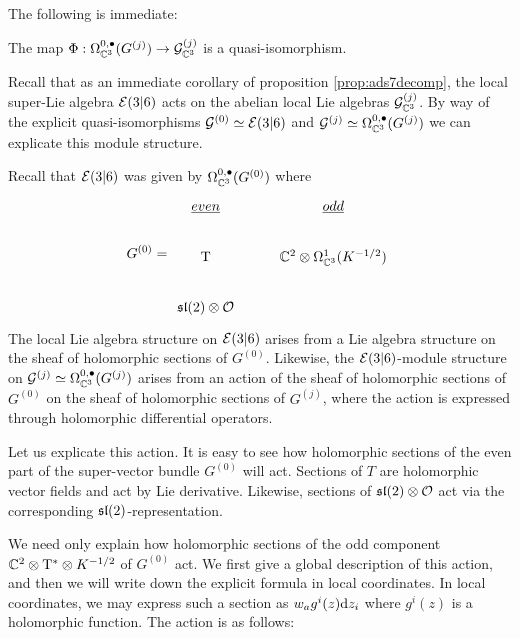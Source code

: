 The following is immediate:

\begin{lem}\label{lem:qisG}
The map $\Phi: \Omega^{0,\bullet}_{\mathbb{C}^3} (G^{(j)} ) \to \mathcal{G}^{(j)}_{\mathbb{C}^3}$ is a quasi-isomorphism.
\end{lem}


\parsec[]
Recall that as an immediate corollary of proposition \ref{prop:ads7decomp}, the local super-Lie algebra $\mathcal{E}(3|6)$ acts on the abelian local Lie algebras $\mathcal{G}^{(j)} _{\mathbb{C}^3}$. By way of the explicit quasi-isomorphisms  $\mathcal{G}^{(0)} \simeq \mathcal{E}(3|6)$ and $\mathcal{G}^{(j)} \simeq \Omega^{0,\bullet}_{\mathbb{C}^3}( G^{(j)})$ we can explicate this module structure.

Recall that $\mathcal{E}(3|6)$ was given by  $\Omega^{0,\bullet}_{\mathbb{C}^3} (G^{(0)})$ where 
\begin{equation}
G^{(0)} = 
\begin{tikzcd}
\ul{even} & \ul{odd} \\
\T & \C^2\otimes \Omega^1_{\C^3} (K^{-1/2}) \\
\mf {sl}(2)\otimes \mc O
\end{tikzcd}
\end{equation}
The local Lie algebra structure on $\mathcal{E}(3|6)$ arises from a Lie algebra structure on the sheaf of holomorphic sections of $G^{(0)}$. Likewise, the $\mathcal{E}(3|6)$-module structure on $\mathcal{G}^{(j)} \simeq \Omega^{0,\bullet}_{\mathbb{C}^3} (G^{(j)})$ arises from an action of the sheaf of holomorphic sections of $G^{(0)}$ on the sheaf of holomorphic sections of $G^{(j)}$, where the action is expressed through holomorphic differential operators.

Let us explicate this action. It is easy to see how holomorphic sections of the even part of the super-vector bundle $G^{(0)}$ will act. Sections of $T$ are holomorphic vector fields and act by Lie derivative. Likewise, sections of $\mathfrak{sl}(2) \otimes \mathcal{O}$ act via the corresponding $\mathfrak{sl}(2)$-representation.

We need only explain how holomorphic sections of the odd component $\mathbb{C}^2 \otimes {\mathrm{T}}^* \otimes K^{-1/2}$ of $G^{(0)}$ act. We first give a global description of this action, and then we will write down the explicit formula in local coordinates. In local coordinates, we may express such a section as  $w_a g^i(z) \mathrm{d} z_i$ where $g^i(z)$ is a holomorphic function. The action is as follows:
 
